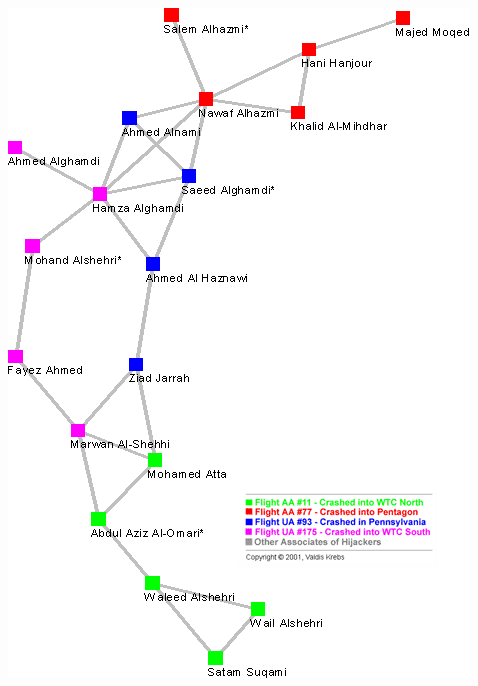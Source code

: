 \documentclass[aspectratio=169]{beamer}
\begin{document}
\begin{frame}

\begin{center}
\includegraphics[height=0.90\textheight]{figures/krebs_uncloaking_2002_fig2}
\end{center}

\vfill
{}

\end{frame}
\end{document}

